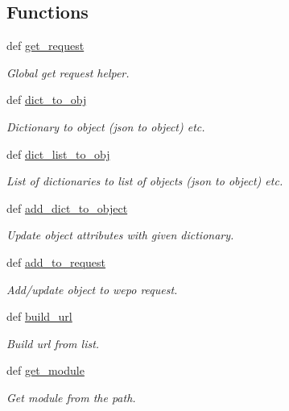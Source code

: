 \subsection*{Functions}
\begin{DoxyCompactItemize}
\item 
def \hyperlink{namespacecore_1_1helper_af4bbf3a391a72499c5840c42ced86051}{get\-\_\-request}
\begin{DoxyCompactList}\small\item\em Global get request helper. \end{DoxyCompactList}\item 
def \hyperlink{namespacecore_1_1helper_a75fc1f2204d7ac3c6090b9cf854c842a}{dict\-\_\-to\-\_\-obj}
\begin{DoxyCompactList}\small\item\em Dictionary to object (json to object) etc. \end{DoxyCompactList}\item 
def \hyperlink{namespacecore_1_1helper_aca3430be2ff434d731113002ae90e432}{dict\-\_\-list\-\_\-to\-\_\-obj}
\begin{DoxyCompactList}\small\item\em List of dictionaries to list of objects (json to object) etc. \end{DoxyCompactList}\item 
def \hyperlink{namespacecore_1_1helper_aea7e9831df34936caaeacc9a1498ad70}{add\-\_\-dict\-\_\-to\-\_\-object}
\begin{DoxyCompactList}\small\item\em Update object attributes with given dictionary. \end{DoxyCompactList}\item 
def \hyperlink{namespacecore_1_1helper_ab3aae413c3bf9c912dd52c22f46cab19}{add\-\_\-to\-\_\-request}
\begin{DoxyCompactList}\small\item\em Add/update object to wepo request. \end{DoxyCompactList}\item 
def \hyperlink{namespacecore_1_1helper_a0646d87e47a6af56a82f5fc3085bee55}{build\-\_\-url}
\begin{DoxyCompactList}\small\item\em Build url from list. \end{DoxyCompactList}\item 
def \hyperlink{namespacecore_1_1helper_a531241dec617f00663b073544cb98eb8}{get\-\_\-module}
\begin{DoxyCompactList}\small\item\em Get module from the path. \end{DoxyCompactList}\item 

\end{DoxyCompactItemize}
